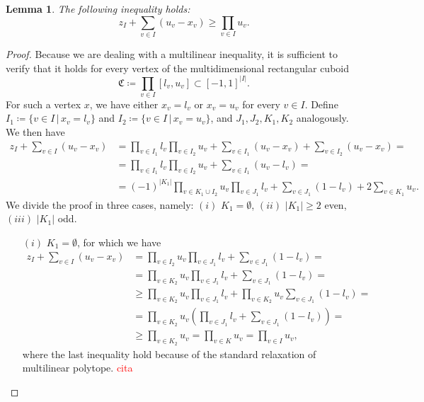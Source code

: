 \documentclass{article}
\newtheorem{lemma}[theorem]{Lemma}
\begin{document}
\begin{lemma}
	The following inequality holds:
	\begin{equation}
		z_I + \sum_{v \in I} (u_v - x_v) \geq \prod_{v \in I} u_v. \label{eq:ineq-lb}
	\end{equation}
\end{lemma}
\begin{proof}
Because we are dealing with a multilinear inequality, it is sufficient to verify that it holds for every vertex of the multidimensional rectangular cuboid
\begin{equation*}
	\mathfrak{C} \coloneqq \prod_{v \in I} [l_v, u_v] \subset [-1, 1]^{|I|}.
\end{equation*} For such a vertex \(x\), we have either \(x_v = l_v\) or \(x_v = u_v\) for every \(v \in I\). Define \(I_1 \coloneqq \{v \in I \, | \, x_v = l_v\}\) and \(I_2 \coloneqq \{v \in I \, | \, x_v = u_v\}\), and \(J_1, J_2, K_1, K_2\) analogously. We then have
\begin{align*}
	z_I + \sum_{v \in I} (u_v - x_v) & = \prod_{v \in I_1} l_v \prod_{v \in I_2} u_v+ \sum_{v \in I_1} (u_v - x_v) + \sum_{v \in I_2} (u_v - x_v) = \\
	& =  \prod_{v \in I_1} l_v \prod_{v \in I_2} u_v+ \sum_{v \in I_1} (u_v - l_v)= \\
	& =   (-1)^{|K_1|}\prod_{v \in K_1 \cup I_2}u_v \prod_{v \in J_1} l_v+ \sum_{v \in J_1} (1 - l_v) + 2\sum_{v \in K_1}u_v.
\end{align*}
We divide the proof in three cases, namely: \((i)\) \(K_1 = \emptyset \), \((ii)\) \(|K_1| \geq 2\) even, \((iii)\) \(|K_1| \) odd.
\begin{itemize}
	\item[\((i)\)] \(K_1 = \emptyset \), for which we have
	\begin{align*}
		z_I + \sum_{v \in I} (u_v - x_v) & = \prod_{v \in I_2}u_v \prod_{v \in J_1} l_v+ \sum_{v \in J_1} (1 - l_v) =\\
		&= \prod_{v \in K_2}u_v \prod_{v \in J_1} l_v+ \sum_{v \in J_1} (1 - l_v) =\\
		& \geq \prod_{v \in K_2}u_v \prod_{v \in J_1} l_v+ \prod_{v \in K_2}u_v\sum_{v \in J_1} (1 - l_v) = \\
		&= \prod_{v \in K_2}u_v (\prod_{v \in J_1} l_v+ \sum_{v \in J_1} (1 - l_v)) = \\
		&\geq \prod_{v \in K_2}u_v = \prod_{v \in K}u_v = \prod_{v \in I}u_v,
	\end{align*}
	where the last inequality hold because of the standard relaxation of multilinear polytope. \textcolor{red}{cita}

\end{itemize}
\end{proof}
\end{document}
